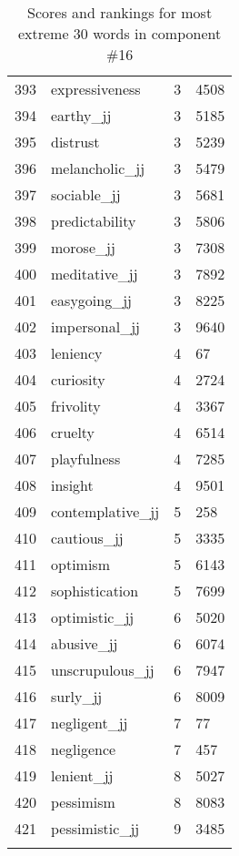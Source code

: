 \begin{longtable}[!htbp]{| rlr@{.}l |}
    393 & expressiveness & 3 & 4508 \\
    394 & earthy\_jj & 3 & 5185 \\
    395 & distrust & 3 & 5239 \\
    396 & melancholic\_jj & 3 & 5479 \\
    397 & sociable\_jj & 3 & 5681 \\
    398 & predictability & 3 & 5806 \\
    399 & morose\_jj & 3 & 7308 \\
    400 & meditative\_jj & 3 & 7892 \\
    401 & easygoing\_jj & 3 & 8225 \\
    402 & impersonal\_jj & 3 & 9640 \\
    403 & leniency & 4 & 67 \\
    404 & curiosity & 4 & 2724 \\
    405 & frivolity & 4 & 3367 \\
    406 & cruelty & 4 & 6514 \\
    407 & playfulness & 4 & 7285 \\
    408 & insight & 4 & 9501 \\
    409 & contemplative\_jj & 5 & 258 \\
    410 & cautious\_jj & 5 & 3335 \\
    411 & optimism & 5 & 6143 \\
    412 & sophistication & 5 & 7699 \\
    413 & optimistic\_jj & 6 & 5020 \\
    414 & abusive\_jj & 6 & 6074 \\
    415 & unscrupulous\_jj & 6 & 7947 \\
    416 & surly\_jj & 6 & 8009 \\
    417 & negligent\_jj & 7 & 77 \\
    418 & negligence & 7 & 457 \\
    419 & lenient\_jj & 8 & 5027 \\
    420 & pessimism & 8 & 8083 \\
    421 & pessimistic\_jj & 9 & 3485 \\
    \hline
    \caption{Scores and rankings for most extreme 30 words in component \#16} \\
\end{longtable}
